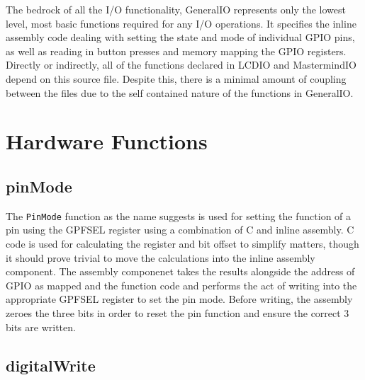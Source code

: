\documentclass[a4paper, titlepage]{article}
\begin{document}
The bedrock of all the I/O functionality, GeneralIO represents only the lowest level, most basic functions required for any I/O operations. It specifies the inline assembly code dealing with setting the state and mode of individual GPIO pins, as well as reading in button presses and memory mapping the GPIO registers. Directly or indirectly, all of the functions declared in LCDIO and MastermindIO depend on this source file. Despite this, there is a minimal amount of coupling between the files due to the self contained nature of the functions in GeneralIO.

\section{Hardware Functions}

\subsection{pinMode}

The \texttt{PinMode} function as the name suggests is used for setting the function of a pin using the GPFSEL register using a combination of C and inline assembly. C code is used for calculating the register and bit offset to simplify matters, though it should prove trivial to move the calculations into the inline assembly component. The assembly componenet takes the results alongside the address of GPIO as mapped and the function code and performs the act of writing into the appropriate GPFSEL register to set the pin mode. Before writing, the assembly zeroes the three bits in order to reset the pin function and ensure the correct 3 bits are written.

\subsection{digitalWrite}
\end{document}
